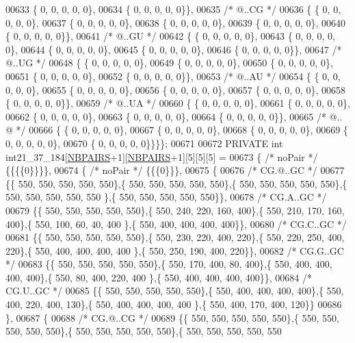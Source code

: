 \begin{DoxyCode}
00633 \{  0, 0, 0, 0, 0\},
00634 \{  0, 0, 0, 0, 0\}\},
00635  \textcolor{comment}{/*  @..CG */}
00636 \{ \{  0, 0, 0, 0, 0\},
00637 \{  0, 0, 0, 0, 0\},
00638 \{  0, 0, 0, 0, 0\},
00639 \{  0, 0, 0, 0, 0\},
00640 \{  0, 0, 0, 0, 0\}\},
00641  \textcolor{comment}{/*  @..GU */}
00642 \{ \{  0, 0, 0, 0, 0\},
00643 \{  0, 0, 0, 0, 0\},
00644 \{  0, 0, 0, 0, 0\},
00645 \{  0, 0, 0, 0, 0\},
00646 \{  0, 0, 0, 0, 0\}\},
00647  \textcolor{comment}{/*  @..UG */}
00648 \{ \{  0, 0, 0, 0, 0\},
00649 \{  0, 0, 0, 0, 0\},
00650 \{  0, 0, 0, 0, 0\},
00651 \{  0, 0, 0, 0, 0\},
00652 \{  0, 0, 0, 0, 0\}\},
00653  \textcolor{comment}{/*  @..AU */}
00654 \{ \{  0, 0, 0, 0, 0\},
00655 \{  0, 0, 0, 0, 0\},
00656 \{  0, 0, 0, 0, 0\},
00657 \{  0, 0, 0, 0, 0\},
00658 \{  0, 0, 0, 0, 0\}\},
00659  \textcolor{comment}{/*  @..UA */}
00660 \{ \{  0, 0, 0, 0, 0\},
00661 \{  0, 0, 0, 0, 0\},
00662 \{  0, 0, 0, 0, 0\},
00663 \{  0, 0, 0, 0, 0\},
00664 \{  0, 0, 0, 0, 0\}\},
00665  \textcolor{comment}{/*  @.. @ */}
00666 \{ \{  0, 0, 0, 0, 0\},
00667 \{  0, 0, 0, 0, 0\},
00668 \{  0, 0, 0, 0, 0\},
00669 \{  0, 0, 0, 0, 0\},
00670 \{  0, 0, 0, 0, 0\}\}\}\};
00671 
00672 PRIVATE \textcolor{keywordtype}{int} int21\_37\_184[\hyperlink{energy__const_8h_a5e75221c779d618eab81e096f37e32ce}{NBPAIRS}+1][\hyperlink{energy__const_8h_a5e75221c779d618eab81e096f37e32ce}{NBPAIRS}+1][5][5][5] =
00673 \{ \textcolor{comment}{/* noPair */} \{\{\{\{0\}\}\}\},
00674 \{ \textcolor{comment}{/* noPair */} \{\{\{0\}\}\},
00675 \{
00676 \textcolor{comment}{/* CG.@..GC */}
00677 \{\{ 550, 550, 550, 550, 550\},\{ 550, 550, 550, 550, 550\},\{ 550, 550, 550, 550, 550\},\{ 550, 550, 550, 550, 550
      \},\{ 550, 550, 550, 550, 550\}\},
00678 \textcolor{comment}{/* CG.A..GC */}
00679 \{\{ 550, 550, 550, 550, 550\},\{ 550, 240, 220, 160, 400\},\{ 550, 210, 170, 160, 400\},\{ 550, 100,  60,  40, 400
      \},\{ 550, 400, 400, 400, 400\}\},
00680 \textcolor{comment}{/* CG.C..GC */}
00681 \{\{ 550, 550, 550, 550, 550\},\{ 550, 230, 220, 400, 220\},\{ 550, 220, 250, 400, 220\},\{ 550, 400, 400, 400, 400
      \},\{ 550, 250, 190, 400, 220\}\},
00682 \textcolor{comment}{/* CG.G..GC */}
00683 \{\{ 550, 550, 550, 550, 550\},\{ 550, 170, 400,  80, 400\},\{ 550, 400, 400, 400, 400\},\{ 550,  80, 400, 220, 400
      \},\{ 550, 400, 400, 400, 400\}\},
00684 \textcolor{comment}{/* CG.U..GC */}
00685 \{\{ 550, 550, 550, 550, 550\},\{ 550, 400, 400, 400, 400\},\{ 550, 400, 220, 400, 130\},\{ 550, 400, 400, 400, 400
      \},\{ 550, 400, 170, 400, 120\}\}
00686 \},
00687 \{
00688 \textcolor{comment}{/* CG.@..CG */}
00689 \{\{ 550, 550, 550, 550, 550\},\{ 550, 550, 550, 550, 550\},\{ 550, 550, 550, 550, 550\},\{ 550, 550, 550, 550, 550

\end{DoxyCode}
